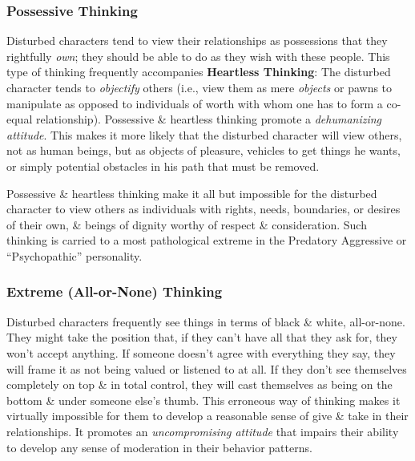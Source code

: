 \documentclass{article}
\numberwithin{equation}{section}
\begin{document}
\subsubsection{Possessive Thinking}
Disturbed characters tend to view their relationships as possessions that they rightfully \textit{own}; they should be able to do as they wish with these people. This type of thinking frequently accompanies \textbf{Heartless Thinking}: The disturbed character tends to \textit{objectify} others (i.e., view them as mere \textit{objects} or pawns to manipulate as opposed to individuals of worth with whom one has to form a co-equal relationship). Possessive \& heartless thinking promote a \textit{dehumanizing attitude}. This makes it more likely that the disturbed character will view others, not as human beings, but as objects of pleasure, vehicles to get things he wants, or simply potential obstacles in his path that must be removed.

Possessive \& heartless thinking make it all but impossible for the disturbed character to view others as individuals with rights, needs, boundaries, or desires of their own, \& beings of dignity worthy of respect \& consideration. Such thinking is carried to a most pathological extreme in the Predatory Aggressive or ``Psychopathic'' personality.

\subsubsection{Extreme (All-or-None) Thinking}
Disturbed characters frequently see things in terms of black \& white, all-or-none. They might take the position that, if they can't have all that they ask for, they won't accept anything. If someone doesn't agree with everything they say, they will frame it as not being valued or listened to at all. If they don't see themselves completely on top \& in total control, they will cast themselves as being on the bottom \& under someone else's thumb. This erroneous way of thinking makes it virtually impossible for them to develop a reasonable sense of give \& take in their relationships. It promotes an \textit{uncompromising attitude} that impairs their ability to develop any sense of moderation in their behavior patterns.
\end{document}
